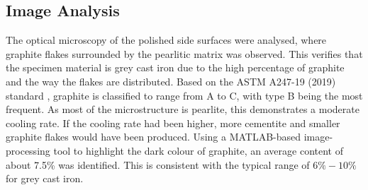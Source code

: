 \documentclass[11pt,a4paper]{article}
\begin{document}
\subsection{Image Analysis}
\label{Image_analysis}
The optical microscopy of the polished side surfaces were analysed, where graphite flakes surrounded by the pearlitic matrix was observed. This verifies that the specimen material is grey cast iron due to the high percentage of graphite and the way the flakes are distributed. Based on the ASTM A247-19 (2019) standard \cite{ASTM:A247}, graphite is classified to range from A to C, with type B being the most frequent. As most of the microstructure is pearlite, this demonstrates a moderate cooling rate. If the cooling rate had been higher, more cementite and smaller graphite flakes would have been produced. Using a MATLAB-based image-processing tool to highlight the dark colour of graphite, an average content of about 7.5\% was identified. This is consistent with the typical range of $6\%-10\%$ for grey cast iron. 
\end{document}
